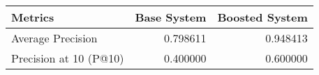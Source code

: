 \begin{tabular}{lrr}
\toprule
               Metrics &  Base System &  Boosted System \\
\midrule
     Average Precision &     0.798611 &        0.948413 \\
Precision at 10 (P@10) &     0.400000 &        0.600000 \\
\bottomrule
\end{tabular}
